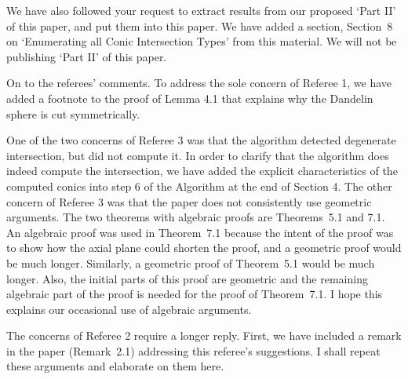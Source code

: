 \begin{letter}


We have also followed your request to extract
results from our proposed `Part II' of this paper, and put them into
this paper.
We have added a section, Section~8 on `Enumerating all Conic Intersection
Types' from this material.
We will not be publishing `Part II' of this paper.


On to the referees' comments.
To address the sole concern of Referee 1,
we have added a footnote to the proof of Lemma 4.1 that
explains why the Dandelin sphere is cut symmetrically.

One of the two concerns of Referee 3 was that the algorithm detected 
degenerate intersection, but did not compute it.
In order to clarify that the algorithm does indeed compute the intersection,
we have added the explicit characteristics of the computed conics
into step 6 of the Algorithm at the end of Section 4.
The other concern of Referee 3 was that the paper does not consistently
use geometric arguments.
The two theorems with algebraic proofs are Theorems~5.1 and 7.1.
An algebraic proof was used in Theorem~7.1 because
the intent of the proof was to show how the axial plane
could shorten the proof, and a geometric proof would be much longer.
Similarly, a geometric proof of Theorem~5.1 would be much longer.
Also, the initial parts of this proof are geometric
and the remaining algebraic part of the proof is needed for the proof 
of Theorem~7.1.
I hope this explains our occasional use of algebraic arguments.

The concerns of Referee 2 require a longer reply.
First, we have included a remark in the paper (Remark~2.1) addressing
this referee's suggestions.
I shall repeat these arguments and elaborate on them here.


\end{letter}
